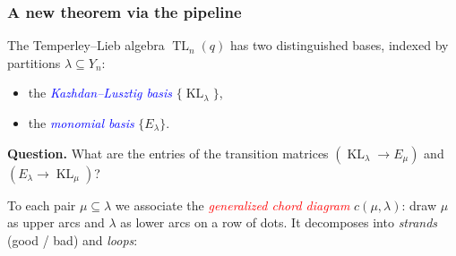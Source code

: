\documentclass{beamer}
\theoremstyle{definition}
\newcommand\KL{\operatorname{KL}}
\newcommand\TL{\operatorname{TL}}
\newcommand\remph[1]{\emph{\textcolor{red}{#1}}}
\newcommand\bemph[1]{\emph{\textcolor{blue}{#1}}}
\begin{document}

\begin{frame}
  \frametitle{A new theorem via the pipeline}
  The Temperley--Lieb algebra \( \TL_n(q) \) has two distinguished bases,
  indexed by partitions \( \lambda \subseteq Y_n \):
  \begin{itemize}
    \item[$\bullet$] the \bemph{Kazhdan--Lusztig basis} \( \{ \KL_\lambda \} \),
    \item[$\bullet$] the \bemph{monomial basis} \( \{ E_\lambda \} \).
  \end{itemize}
  \pause
  \vspace{.15cm}

  \textbf{Question.} What are the entries of the transition matrices
  \( (\KL_\lambda \to E_\mu) \) and \( (E_\lambda \to \KL_\mu) \)?
  \pause
  \vspace{.15cm}

  To each pair \( \mu \subseteq \lambda \) we associate the \remph{generalized
  chord diagram} \( c(\mu,\lambda) \): draw \( \mu \) as upper arcs and
  \( \lambda \) as lower arcs on a row of dots. It decomposes into
  \emph{strands} (good / bad) and \emph{loops}:
  \vspace{.1cm}
  \begin{center}
  \end{center}
\end{frame}

\end{document}
